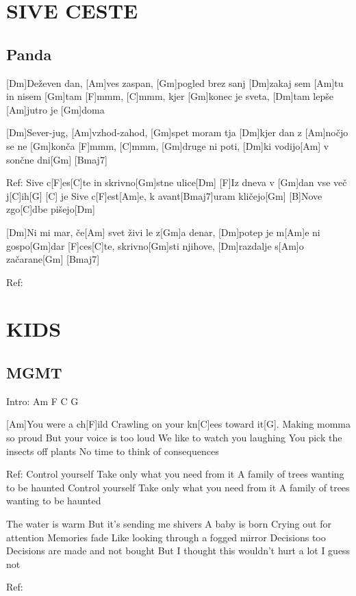 \documentclass{article}
\begin{document}
\section*{SIVE CESTE}
%
\subsection*{Panda}
\begin{guitar}

[Dm]Deževen dan, [Am]ves zaspan, [Gm]pogled brez sanj
[Dm]zakaj sem [Am]tu in nisem [Gm]tam
[F]mmm, [C]mmm, kjer [Gm]konec je sveta, [Dm]tam lepše [Am]jutro je [Gm]doma
\linebreak

[Dm]Sever-jug, [Am]vzhod-zahod, [Gm]spet moram tja
[Dm]kjer dan z [Am]nočjo se ne [Gm]konča
[F]mmm, [C]mmm, [Gm]druge ni poti, [Dm]ki vodijo[Am] v sončne dni[Gm] [Bmaj7]
\linebreak

Ref:
Sive c[F]es[C]te in skrivno[Gm]stne ulice[Dm]
[F]Iz dneva v [Gm]dan vse več j[C]ih[G] [C] je
Sive c[F]est[Am]e, k avant[Bmaj7]uram kličejo[Gm]
[B]Nove zgo[C]dbe pišejo[Dm]
\linebreak

[Dm]Ni mi mar, če[Am] svet živi le z[Gm]a denar,
[Dm]potep je m[Am]e ni gospo[Gm]dar
[F]ces[C]te, skrivno[Gm]sti njihove, [Dm]razdalje s[Am]o začarane[Gm] [Bmaj7]
\linebreak

Ref:
\end{guitar}

\section*{KIDS}
%
\subsection*{MGMT}
\begin{guitar}
	Intro: Am F C G
	
	[Am]You were a ch[F]ild
	Crawling on your kn[C]ees toward it[G]. 
	Making momma so proud
	But your voice is too loud
	We like to watch you laughing
	You pick the insects off plants
	No time to think of consequences
	
	
	Ref:
	Control yourself
	Take only what you need from it
	A family of trees wanting to be haunted
	Control yourself
	Take only what you need from it
	A family of trees wanting to be haunted
	
	
	The water is warm
	But it's sending me shivers
	A baby is born
	Crying out for attention
	Memories fade
	Like looking through a fogged mirror
	Decisions too
	Decisions are made and not bought
	But I thought this wouldn't hurt a lot
	I guess not
	
	Ref:

\end{guitar}
\end{document}
